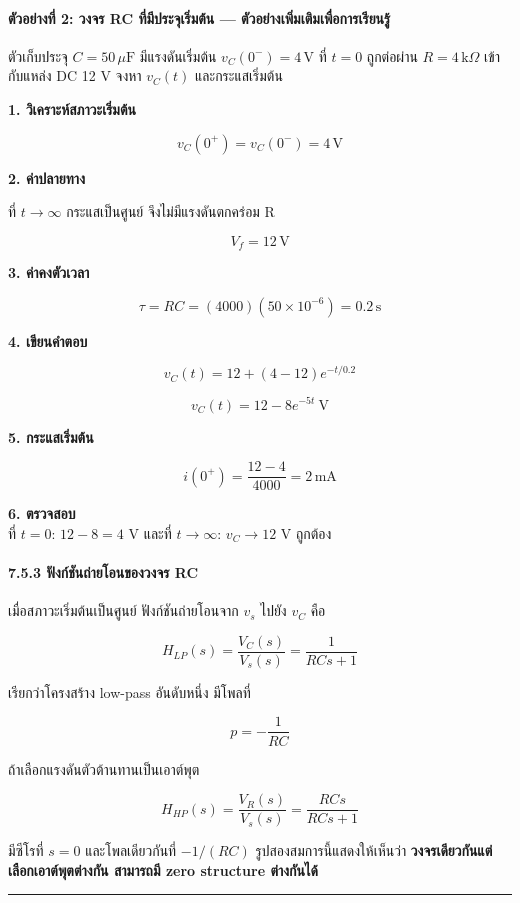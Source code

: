 \paragraph{ตัวอย่างที่ 2: วงจร RC ที่มีประจุเริ่มต้น — ตัวอย่างเพิ่มเติมเพื่อการเรียนรู้}

ตัวเก็บประจุ $C=50\,\mu\text{F}$ มีแรงดันเริ่มต้น $v_C(0^-)=4\,\text{V}$ ที่ $t=0$ ถูกต่อผ่าน $R=4\,\text{k}\Omega$ เข้ากับแหล่ง DC 12 V จงหา $v_C(t)$ และกระแสเริ่มต้น

\textbf{1. วิเคราะห์สภาวะเริ่มต้น}

\[
v_C(0^+)=v_C(0^-)=4\,\text{V}
\]

\textbf{2. ค่าปลายทาง}

ที่ $t\to\infty$ กระแสเป็นศูนย์ จึงไม่มีแรงดันตกคร่อม R

\[
V_f=12\,\text{V}
\]

\textbf{3. ค่าคงตัวเวลา}

\[
\tau=RC=(4000)(50\times10^{-6})=0.2\,\text{s}
\]

\textbf{4. เขียนคำตอบ}

\[
v_C(t)=12+(4-12)e^{-t/0.2}
\]

\[
\boxed{v_C(t)=12-8e^{-5t}\ \text{V}}
\]

\textbf{5. กระแสเริ่มต้น}

\[
i(0^+)=\frac{12-4}{4000}=2\,\text{mA}
\]

\textbf{6. ตรวจสอบ}\\
ที่ $t=0$: $12-8=4$ V และที่ $t\to\infty$: $v_C\to12$ V ถูกต้อง

\paragraph{7.5.3 ฟังก์ชันถ่ายโอนของวงจร RC}

เมื่อสภาวะเริ่มต้นเป็นศูนย์ ฟังก์ชันถ่ายโอนจาก $v_s$ ไปยัง $v_C$ คือ

\[
H_{LP}(s)=\frac{V_C(s)}{V_s(s)}=\frac{1}{RCs+1}
\]

เรียกว่าโครงสร้าง low-pass อันดับหนึ่ง มีโพลที่

\[
p=-\frac{1}{RC}
\]

ถ้าเลือกแรงดันตัวต้านทานเป็นเอาต์พุต

\[
H_{HP}(s)=\frac{V_R(s)}{V_s(s)}=\frac{RCs}{RCs+1}
\]

มีซีโรที่ $s=0$ และโพลเดียวกันที่ $-1/(RC)$ รูปสองสมการนี้แสดงให้เห็นว่า \textbf{วงจรเดียวกันแต่เลือกเอาต์พุตต่างกัน สามารถมี zero structure ต่างกันได้}

\par\noindent\rule{\textwidth}{0.4pt}\par

